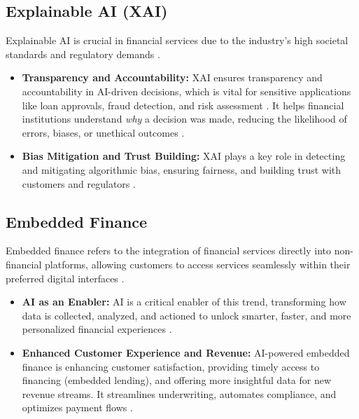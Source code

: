 \subsection{Explainable AI (XAI)}
Explainable AI is crucial in financial services due to the industry's high societal standards and regulatory demands \cite{Synechron_XAI, NIX_XAI}.
\begin{itemize}
    \item \textbf{Transparency and Accountability:} XAI ensures transparency and accountability in AI-driven decisions, which is vital for sensitive applications like loan approvals, fraud detection, and risk assessment \cite{Lumenova_XAI, CorporateFinanceInstitute_XAI}. It helps financial institutions understand \textit{why} a decision was made, reducing the likelihood of errors, biases, or unethical outcomes \cite{NIX_XAI}.
    \item \textbf{Bias Mitigation and Trust Building:} XAI plays a key role in detecting and mitigating algorithmic bias, ensuring fairness, and building trust with customers and regulators \cite{EY_XAI}.
\end{itemize}

\subsection{Embedded Finance}
Embedded finance refers to the integration of financial services directly into non-financial platforms, allowing customers to access services seamlessly within their preferred digital interfaces \cite{Medium_EmbeddedFinance, ABA_EmbeddedFinance}.
\begin{itemize}
    \item \textbf{AI as an Enabler:} AI is a critical enabler of this trend, transforming how data is collected, analyzed, and actioned to unlock smarter, faster, and more personalized financial experiences \cite{Medium_EmbeddedFinance}. 
    \item \textbf{Enhanced Customer Experience and Revenue:} AI-powered embedded finance is enhancing customer satisfaction, providing timely access to financing (embedded lending), and offering more insightful data for new revenue streams. It streamlines underwriting, automates compliance, and optimizes payment flows \cite{ABA_EmbeddedFinance}.
\end{itemize}

